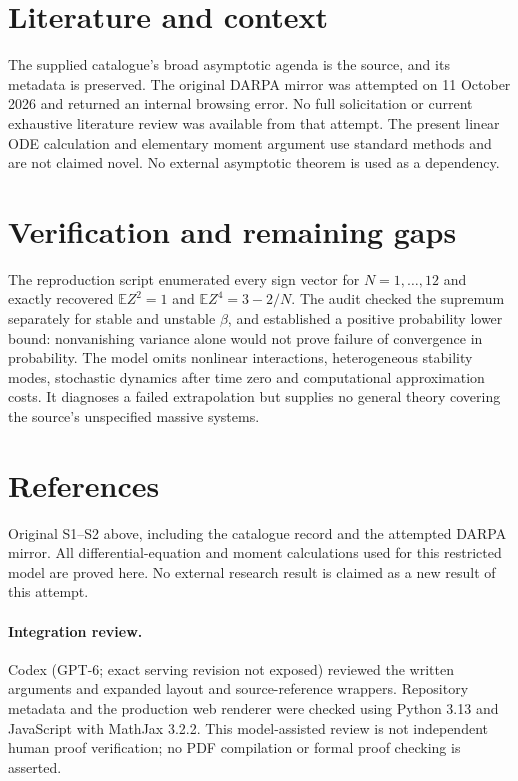 \documentclass[11pt]{article}
\begin{document}
\section{Literature and context}
The supplied catalogue's broad asymptotic agenda is the source, and its metadata is preserved. The original DARPA mirror was attempted on 11 October 2026 and returned an internal browsing error. No full solicitation or current exhaustive literature review was available from that attempt. The present linear ODE calculation and elementary moment argument use standard methods and are not claimed novel. No external asymptotic theorem is used as a dependency.

\section{Verification and remaining gaps}
The reproduction script enumerated every sign vector for $N=1,\ldots,12$ and exactly recovered $\mathbb EZ^2=1$ and $\mathbb EZ^4=3-2/N$. The audit checked the supremum separately for stable and unstable $\beta$, and established a positive probability lower bound: nonvanishing variance alone would not prove failure of convergence in probability. The model omits nonlinear interactions, heterogeneous stability modes, stochastic dynamics after time zero and computational approximation costs. It diagnoses a failed extrapolation but supplies no general theory covering the source's unspecified massive systems.

\section{References}
Original S1--S2 above, including the catalogue record and the attempted DARPA mirror. All differential-equation and moment calculations used for this restricted model are proved here. No external research result is claimed as a new result of this attempt.


\paragraph{Integration review.} Codex (GPT-6; exact serving revision not exposed) reviewed the written arguments and expanded layout and source-reference wrappers. Repository metadata and the production web renderer were checked using Python 3.13 and JavaScript with MathJax 3.2.2. This model-assisted review is not independent human proof verification; no PDF compilation or formal proof checking is asserted.
\end{document}
